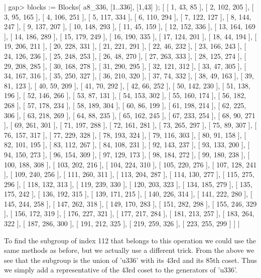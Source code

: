 |    gap> blocks := Blocks( a8_336, [1..336], [1,43] );
    [ [ 1, 43, 85 ], [ 2, 102, 205 ], [ 3, 95, 165 ], [ 4, 106, 251 ],
      [ 5, 117, 334 ], [ 6, 110, 294 ], [ 7, 122, 127 ], [ 8, 144, 247 ],
      [ 9, 137, 207 ], [ 10, 148, 293 ], [ 11, 45, 159 ],
      [ 12, 152, 336 ], [ 13, 164, 169 ], [ 14, 186, 289 ],
      [ 15, 179, 249 ], [ 16, 190, 335 ], [ 17, 124, 201 ],
      [ 18, 44, 194 ], [ 19, 206, 211 ], [ 20, 228, 331 ],
      [ 21, 221, 291 ], [ 22, 46, 232 ], [ 23, 166, 243 ],
      [ 24, 126, 236 ], [ 25, 248, 253 ], [ 26, 48, 270 ],
      [ 27, 263, 333 ], [ 28, 125, 274 ], [ 29, 208, 285 ],
      [ 30, 168, 278 ], [ 31, 290, 295 ], [ 32, 121, 312 ],
      [ 33, 47, 305 ], [ 34, 167, 316 ], [ 35, 250, 327 ],
      [ 36, 210, 320 ], [ 37, 74, 332 ], [ 38, 49, 163 ], [ 39, 81, 123 ],
      [ 40, 59, 209 ], [ 41, 70, 292 ], [ 42, 66, 252 ], [ 50, 142, 230 ],
      [ 51, 138, 196 ], [ 52, 146, 266 ], [ 53, 87, 131 ],
      [ 54, 153, 302 ], [ 55, 160, 174 ], [ 56, 182, 268 ],
      [ 57, 178, 234 ], [ 58, 189, 304 ], [ 60, 86, 199 ],
      [ 61, 198, 214 ], [ 62, 225, 306 ], [ 63, 218, 269 ],
      [ 64, 88, 235 ], [ 65, 162, 245 ], [ 67, 233, 254 ],
      [ 68, 90, 271 ], [ 69, 261, 301 ], [ 71, 197, 288 ],
      [ 72, 161, 281 ], [ 73, 265, 297 ], [ 75, 89, 307 ],
      [ 76, 157, 317 ], [ 77, 229, 328 ], [ 78, 193, 324 ],
      [ 79, 116, 303 ], [ 80, 91, 158 ], [ 82, 101, 195 ],
      [ 83, 112, 267 ], [ 84, 108, 231 ], [ 92, 143, 237 ],
      [ 93, 133, 200 ], [ 94, 150, 273 ], [ 96, 154, 309 ],
      [ 97, 129, 173 ], [ 98, 184, 272 ], [ 99, 180, 238 ],
      [ 100, 188, 308 ], [ 103, 202, 216 ], [ 104, 224, 310 ],
      [ 105, 220, 276 ], [ 107, 128, 241 ], [ 109, 240, 256 ],
      [ 111, 260, 311 ], [ 113, 204, 287 ], [ 114, 130, 277 ],
      [ 115, 275, 296 ], [ 118, 132, 313 ], [ 119, 239, 330 ],
      [ 120, 203, 323 ], [ 134, 185, 279 ], [ 135, 175, 242 ],
      [ 136, 192, 315 ], [ 139, 171, 215 ], [ 140, 226, 314 ],
      [ 141, 222, 280 ], [ 145, 244, 258 ], [ 147, 262, 318 ],
      [ 149, 170, 283 ], [ 151, 282, 298 ], [ 155, 246, 329 ],
      [ 156, 172, 319 ], [ 176, 227, 321 ], [ 177, 217, 284 ],
      [ 181, 213, 257 ], [ 183, 264, 322 ], [ 187, 286, 300 ],
      [ 191, 212, 325 ], [ 219, 259, 326 ], [ 223, 255, 299 ] ] |

To find the subgroup of index 112 that belongs to this operation we could
use the  same methods  as before, but we actually use  a different trick.
From the  above we see that the subgroup is the union of 'u336'  with its
43rd and its 85th coset.  Thus we simply add a representative of the 43rd
coset to the generators of 'u336'.

